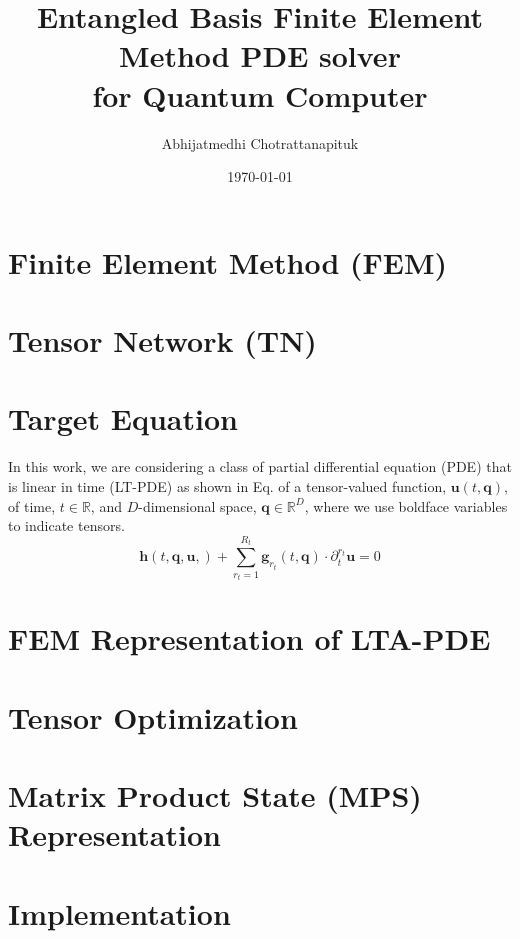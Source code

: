 \documentclass[preprint, 12pt]{revtex4-2}
\numberwithin{equation}{section}
\begin{document}
\title{Entangled Basis Finite Element Method PDE solver\\for Quantum Computer}

\author{Abhijatmedhi Chotrattanapituk}

\date{\today}

\maketitle
\section{Finite Element Method (FEM)}

\newpage

\section{Tensor Network (TN)}

\newpage

\section{Target Equation}
In this work, we are considering a class of partial differential equation (PDE) that is linear in time (LT-PDE) as shown in Eq. of a tensor-valued function, $\mathbf{u}(t, \mathbf{q})$, of time, $t\in \mathbb{R}$, and $D$-dimensional space, $\mathbf{q}\in\mathbb{R}^D$, where we use boldface variables to indicate tensors.
\begin{equation}
    \mathbf{h}(t, \textbf{q}, \textbf{u}, ) + \sum_{r_t=1}^{R_t}\textbf{g}_{r_t}(t, \mathbf{q})\cdot\partial_t^{r_t}\mathbf{u} = 0
\end{equation}

\newpage

\section{FEM Representation of LTA-PDE}

\newpage

\section{Tensor Optimization}

\newpage

\section{Matrix Product State (MPS) Representation}

\newpage

\section{Implementation}
\end{document}
